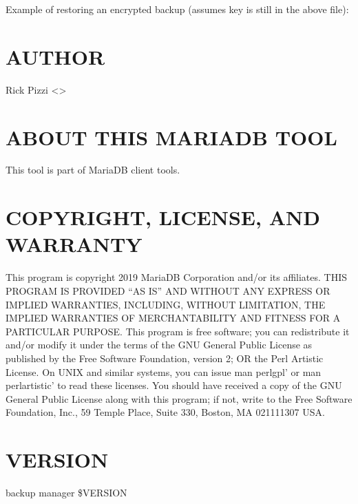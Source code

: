 \documentclass[letterpaper,10pt,english]{sphinxmanual}
\begin{document}
\sphinxAtStartPar
Example of restoring an encrypted backup (assumes key is still in the above file):
\begin{quote}

\sphinxAtStartPar
{}
\end{quote}


\section{AUTHOR}
\label{\detokenize{mariadb-backup-manager:author}}
\sphinxAtStartPar
Rick Pizzi \textless{}\textgreater{}


\section{ABOUT THIS MARIADB TOOL}
\label{\detokenize{mariadb-backup-manager:about-this-mariadb-tool}}
\sphinxAtStartPar
This tool is part of MariaDB client tools.


\section{COPYRIGHT, LICENSE, AND WARRANTY}
\label{\detokenize{mariadb-backup-manager:copyright-license-and-warranty}}
\sphinxAtStartPar
This program is copyright 2019 MariaDB Corporation and/or its affiliates.
THIS PROGRAM IS PROVIDED “AS IS” AND WITHOUT ANY EXPRESS OR IMPLIED
WARRANTIES, INCLUDING, WITHOUT LIMITATION, THE IMPLIED WARRANTIES OF
MERCHANTABILITY AND FITNESS FOR A PARTICULAR PURPOSE.
This program is free software; you can redistribute it and/or modify it under
the terms of the GNU General Public License as published by the Free Software
Foundation, version 2; OR the Perl Artistic License.  On UNIX and similar
systems, you can issue \textasciigrave{}man perlgpl’ or \textasciigrave{}man perlartistic’ to read these
licenses.
You should have received a copy of the GNU General Public License along with
this program; if not, write to the Free Software Foundation, Inc., 59 Temple
Place, Suite 330, Boston, MA  02111\sphinxhyphen{}1307  USA.


\section{VERSION}
\label{\detokenize{mariadb-backup-manager:version}}
\sphinxAtStartPar
backup manager \$VERSION
\end{document}
